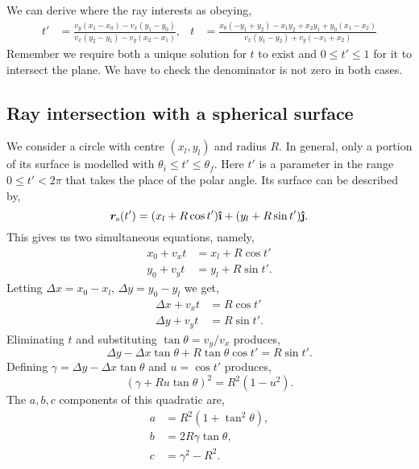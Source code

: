 \documentclass{article}
\let\vec \bm
\newcommand{\uveci}{{\bm{\hat{\textnormal{\bfseries\i}}}}}
\newcommand{\uvecj}{{\bm{\hat{\textnormal{\bfseries\j}}}}}
\begin{document}
We can derive where the ray interests as obeying,
\begin{align}
    t'
    &=
    \frac{v_y(x_1 - x_0) - v_x(y_1 - y_0)}{v_x(y_2 - y_1) - v_y(x_2 - x_1)}, &
    t
    &=
    \frac{x_{0} \left(- y_{1} + y_{2}\right) - x_{1} y_{2} + x_{2} y_{1} + y_{0} \left(x_{1} - x_{2}\right)}{v_{x} \left(y_{1} - y_{2}\right) + v_{y} \left(- x_{1} + x_{2}\right)}
\end{align}
Remember we require both a unique solution for $t$ to exist and $0 \le t' \le 1$ for it to intersect the plane. We have to check the denominator is not zero in both cases.

\subsection{Ray intersection with a spherical surface}
We consider a circle with centre $(x_l, y_l)$ and radius $R$. In general, only a portion of its surface is modelled with $\theta_i \le t' \le \theta_f$. Here $t'$ is a parameter in the range $0 \le t' < 2\pi$ that takes the place of the polar angle. Its surface can be described by,
\begin{equation}
    \vec{r}_\mathrm{s}(t')
    =
    (x_l + R\cos t') \uveci
    +
    (y_l + R\sin t') \uvecj.
\end{equation}
This gives us two simultaneous equations, namely,
\begin{align}
    x_0 + v_x t &= x_l + R\cos t' \\
    y_0 + v_y t &= y_l + R\sin t'.
\end{align}
Letting $\Delta x = x_0 - x_l$, $\Delta y = y_0 - y_l$ we get,
\begin{align}
    \Delta x + v_x t &= R\cos t' \\
    \Delta y + v_y t &= R\sin t'.
\end{align}
Eliminating $t$ and substituting $\tan \theta = v_y/v_x$ produces,
\begin{equation}
    \Delta y - \Delta x \tan \theta + R \tan \theta \cos t'
    =
    R\sin t'.
\end{equation}
Defining $\gamma = \Delta y - \Delta x \tan \theta$ and $u = \cos t'$ produces,
\begin{equation}
    \left(
        \gamma + R u\tan \theta
    \right)^2
    =
    R^2 \left(
        1-u^2
    \right).
\end{equation}
The $a, b, c$ components of this quadratic are,
\begin{align}
    a
    &=
    R^2 \left( 1 + \tan^2 \theta \right), \\
    b
    &=
    2 R\gamma \tan \theta, \\
    c
    &=
    \gamma^2 - R^2.
\end{align}
\end{document}
